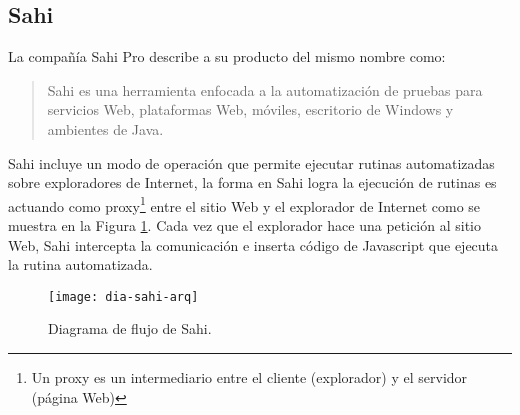 \subsection{Sahi}\label{sec-sahi}
La compañía Sahi Pro\textsuperscript{\textcopyright}\cite{SahiPro} describe a su producto del mismo nombre como:
\begin{quote}
	Sahi es una herramienta enfocada a la automatización de pruebas para servicios Web, plataformas Web, móviles, escritorio de Windows\textsuperscript{\textcopyright} y ambientes de Java.
\end{quote}

Sahi incluye un modo de operación que permite ejecutar rutinas automatizadas sobre exploradores de Internet, la forma en Sahi logra la ejecución de rutinas es actuando como proxy\footnote{Un proxy es un intermediario entre el cliente (explorador) y el servidor (página Web)\cite{BeginningUbuntuLinux}} entre el sitio Web y el explorador de Internet como se muestra en la Figura \ref{fig:dia-sahi-arq}. Cada vez que el explorador hace una petición al sitio Web, Sahi intercepta la comunicación e inserta código de Javascript que ejecuta la rutina automatizada.\cite{WebEng9IntConf, SahiPro}

\begin{figure}[h]
\centering
\texttt{[image: dia-sahi-arq]}
\caption{Diagrama de flujo de Sahi\cite{SahiPro}.}
\label{fig:dia-sahi-arq}
\end{figure}



